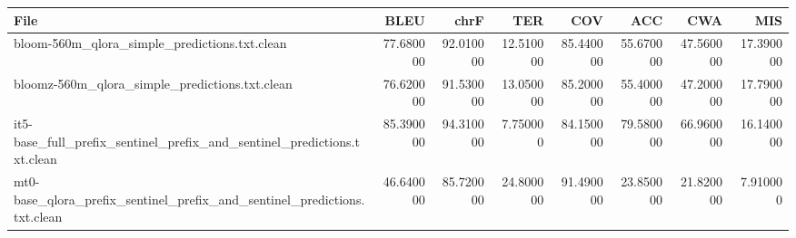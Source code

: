 \begin{tabular}{lrrrrrrr}
\toprule
File & BLEU & chrF & TER & COV & ACC & CWA & MIS \\
\midrule
bloom-560m_qlora_simple_predictions.txt.clean & 77.680000 & 92.010000 & 12.510000 & 85.440000 & 55.670000 & 47.560000 & 17.390000 \\
bloomz-560m_qlora_simple_predictions.txt.clean & 76.620000 & 91.530000 & 13.050000 & 85.200000 & 55.400000 & 47.200000 & 17.790000 \\
it5-base_full_prefix_sentinel_prefix_and_sentinel_predictions.txt.clean & 85.390000 & 94.310000 & 7.750000 & 84.150000 & 79.580000 & 66.960000 & 16.140000 \\
mt0-base_qlora_prefix_sentinel_prefix_and_sentinel_predictions.txt.clean & 46.640000 & 85.720000 & 24.800000 & 91.490000 & 23.850000 & 21.820000 & 7.910000 \\
\bottomrule
\end{tabular}
